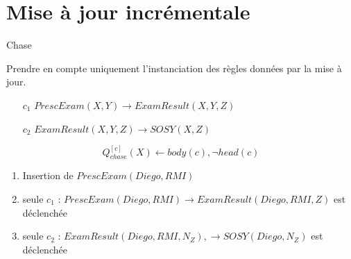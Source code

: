 \section{Mise à jour incrémentale}
\begin{frame}{Chase}
    \begin{block}{}
        Prendre en compte uniquement l'instanciation des règles données par la mise à jour.
        \begin{itemize}
            \item[$c_1$] $PrescExam(X, Y) \to ExamResult(X, Y, Z)$
            \item[$c_2$] $ExamResult(X, Y, Z) \to SOSY(X, Z)$
        \end{itemize}

        \[ Q_{chase}^{[c]}(X) \leftarrow body(c), \lnot head(c) \]
    \end{block}

    \vfill

    \begin{enumerate}
        \item Insertion de $PrescExam(Diego, RMI)$
              \pause
        \item seule $c_1$ : $PrescExam(Diego, RMI) \to ExamResult(Diego, RMI, Z)$ est déclenchée
              \pause
        \item seule $c_2$ : $ExamResult(Diego, RMI, N_Z), \to SOSY(Diego, N_Z)$ est déclenchée\\
    \end{enumerate}

\end{frame}

